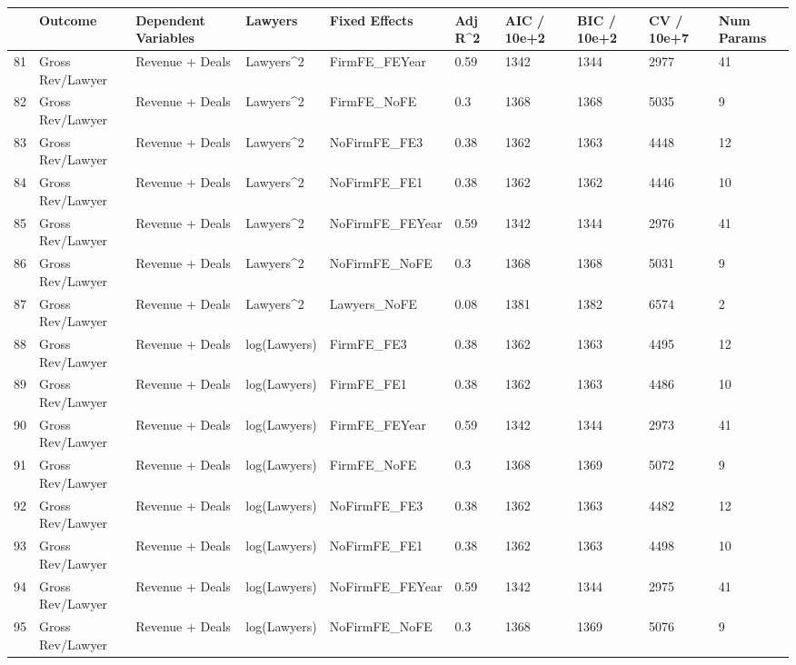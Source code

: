 \begin{table}[ht]
\centering
\begin{tabular}{rlllllllll}
  \hline
 & Outcome & Dependent Variables & Lawyers & Fixed Effects & Adj R^2 & AIC / 10e+2 & BIC / 10e+2 & CV / 10e+7 & Num Params \\ 
  \hline
81 & Gross Rev/Lawyer & Revenue + Deals & Lawyers^2 & FirmFE\_FEYear & 0.59 & 1342 & 1344 & 2977 & 41 \\ 
  82 & Gross Rev/Lawyer & Revenue + Deals & Lawyers^2 & FirmFE\_NoFE & 0.3 & 1368 & 1368 & 5035 & 9 \\ 
  83 & Gross Rev/Lawyer & Revenue + Deals & Lawyers^2 & NoFirmFE\_FE3 & 0.38 & 1362 & 1363 & 4448 & 12 \\ 
  84 & Gross Rev/Lawyer & Revenue + Deals & Lawyers^2 & NoFirmFE\_FE1 & 0.38 & 1362 & 1362 & 4446 & 10 \\ 
  85 & Gross Rev/Lawyer & Revenue + Deals & Lawyers^2 & NoFirmFE\_FEYear & 0.59 & 1342 & 1344 & 2976 & 41 \\ 
  86 & Gross Rev/Lawyer & Revenue + Deals & Lawyers^2 & NoFirmFE\_NoFE & 0.3 & 1368 & 1368 & 5031 & 9 \\ 
  87 & Gross Rev/Lawyer & Revenue + Deals & Lawyers^2 & Lawyers\_NoFE & 0.08 & 1381 & 1382 & 6574 & 2 \\ 
  88 & Gross Rev/Lawyer & Revenue + Deals & log(Lawyers) & FirmFE\_FE3 & 0.38 & 1362 & 1363 & 4495 & 12 \\ 
  89 & Gross Rev/Lawyer & Revenue + Deals & log(Lawyers) & FirmFE\_FE1 & 0.38 & 1362 & 1363 & 4486 & 10 \\ 
  90 & Gross Rev/Lawyer & Revenue + Deals & log(Lawyers) & FirmFE\_FEYear & 0.59 & 1342 & 1344 & 2973 & 41 \\ 
  91 & Gross Rev/Lawyer & Revenue + Deals & log(Lawyers) & FirmFE\_NoFE & 0.3 & 1368 & 1369 & 5072 & 9 \\ 
  92 & Gross Rev/Lawyer & Revenue + Deals & log(Lawyers) & NoFirmFE\_FE3 & 0.38 & 1362 & 1363 & 4482 & 12 \\ 
  93 & Gross Rev/Lawyer & Revenue + Deals & log(Lawyers) & NoFirmFE\_FE1 & 0.38 & 1362 & 1363 & 4498 & 10 \\ 
  94 & Gross Rev/Lawyer & Revenue + Deals & log(Lawyers) & NoFirmFE\_FEYear & 0.59 & 1342 & 1344 & 2975 & 41 \\ 
  95 & Gross Rev/Lawyer & Revenue + Deals & log(Lawyers) & NoFirmFE\_NoFE & 0.3 & 1368 & 1369 & 5076 & 9 \\ 

\end{tabular}
\end{table}
